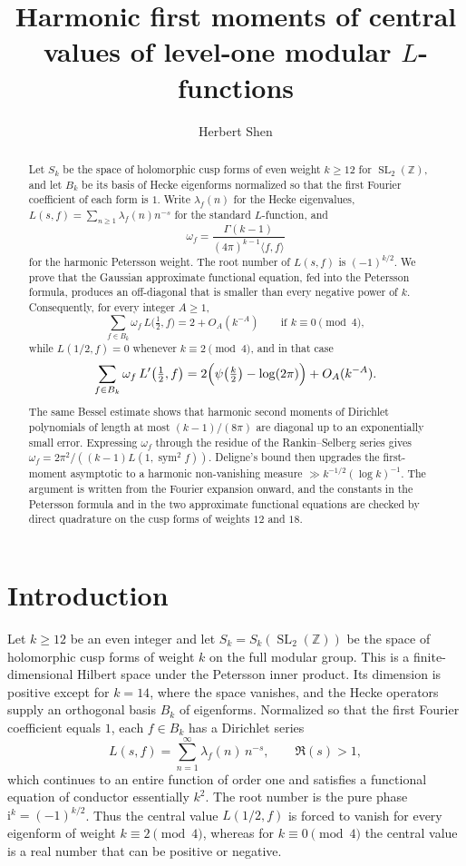 \documentclass[11pt]{amsart}
\title[Harmonic first moments of level-one central values]{Harmonic first moments of central values of level-one modular $L$-functions}
\author{Herbert Shen}
\date{}
\theoremstyle{definition}
\theoremstyle{remark}
\numberwithin{equation}{section}
\DeclareMathOperator{\SL}{SL}
\DeclareMathOperator{\sym}{sym}
\newcommand{\ZZ}{\mathbb{Z}}
\newcommand{\ii}{\mathrm{i}}
\begin{document}
\begin{abstract}
Let $S_k$ be the space of holomorphic cusp forms of even weight $k\ge 12$ for $\SL_2(\ZZ)$, and let $B_k$ be its basis of Hecke eigenforms normalized so that the first Fourier coefficient of each form is $1$. Write $\lambda_f(n)$ for the Hecke eigenvalues, $L(s,f)=\sum_{n\ge 1}\lambda_f(n)n^{-s}$ for the standard $L$-function, and
\[
\omega_f=\frac{\Gamma(k-1)}{(4\pi)^{k-1}\langle f,f\rangle}
\]
for the harmonic Petersson weight. The root number of $L(s,f)$ is $(-1)^{k/2}$. We prove that the Gaussian approximate functional equation, fed into the Petersson formula, produces an off-diagonal that is smaller than every negative power of $k$. Consequently, for every integer $A\ge 1$,
\[
\sum_{f\in B_k}\omega_f\, L\bigl(\tfrac12,f\bigr)
=2+O_A(k^{-A})
\qquad\text{if }k\equiv 0\pmod{4},
\]
while $L(1/2,f)=0$ whenever $k\equiv 2\pmod{4}$, and in that case
\[
\sum_{f\in B_k}\omega_f\, L'\bigl(\tfrac12,f\bigr)
=2\Bigl(\psi\bigl(\tfrac k2\bigr)-\log(2\pi)\Bigr)+O_A(k^{-A}).
\]
The same Bessel estimate shows that harmonic second moments of Dirichlet polynomials of length at most $(k-1)/(8\pi)$ are diagonal up to an exponentially small error. Expressing $\omega_f$ through the residue of the Rankin--Selberg series gives $\omega_f=2\pi^2/((k-1)L(1,\sym^2 f))$. Deligne's bound then upgrades the first-moment asymptotic to a harmonic non-vanishing measure $\gg k^{-1/2}(\log k)^{-1}$. The argument is written from the Fourier expansion onward, and the constants in the Petersson formula and in the two approximate functional equations are checked by direct quadrature on the cusp forms of weights $12$ and $18$.
\end{abstract}

\maketitle

\section{Introduction}

Let $k\ge 12$ be an even integer and let $S_k=S_k(\SL_2(\ZZ))$ be the space of holomorphic cusp forms of weight $k$ on the full modular group. This is a finite-dimensional Hilbert space under the Petersson inner product. Its dimension is positive except for $k=14$, where the space vanishes, and the Hecke operators supply an orthogonal basis $B_k$ of eigenforms. Normalized so that the first Fourier coefficient equals $1$, each $f\in B_k$ has a Dirichlet series
\[
L(s,f)=\sum_{n=1}^\infty \lambda_f(n)\,n^{-s},\qquad \Re(s)>1,
\]
which continues to an entire function of order one and satisfies a functional equation of conductor essentially $k^2$. The root number is the pure phase $\ii^k=(-1)^{k/2}$. Thus the central value $L(1/2,f)$ is forced to vanish for every eigenform of weight $k\equiv 2\pmod 4$, whereas for $k\equiv 0\pmod 4$ the central value is a real number that can be positive or negative.
\end{document}
